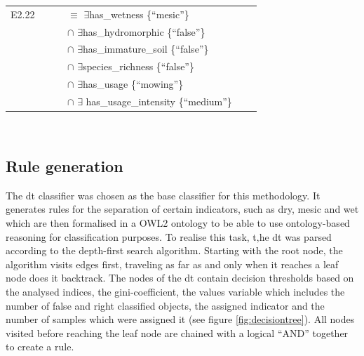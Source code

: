 \documentclass[authoryear,review,12pt,number]{elsarticle}
\begin{document}
\begin{tabular}[h]{p{0.8cm}l p{2cm}l}
    E2.22 &$\qquad$ {} $\equiv$ $\exists$has\_wetness \{``mesic''\} \\
      \ &$\qquad$ {} $\cap$ $\exists$has\_hydromorphic \{``false''\} \\
      \ &$\qquad$ {} $\cap$ $\exists$has\_immature\_soil \{``false''\} \\
     &$\qquad$ {} $\cap$ $\exists$species\_richness \{``false''\} \\
     &$\qquad$ {} $\cap$ $\exists$has\_usage \{``mowing''\} \\
     &$\qquad$ {} $\cap$ $\exists$ has\_usage\_intensity \{``medium''\} \\
\end{tabular}\label{eq:description_logic}\\


\subsection{Rule generation}
\label{subsec:rule_generation}

The \gls{dt} classifier was chosen as the base classifier for this methodology.
It generates rules for the separation of certain indicators, such as dry, mesic
and wet which are then formalised in a OWL2 ontology to be able to use
ontology-based reasoning for classification purposes. To realise this task, t‚he
\gls{dt} was parsed according to the depth-first search algorithm. %
Starting with the root node, the algorithm visits edges first, traveling as far as and
only when it reaches a leaf node does it backtrack.%
 The nodes of the \gls{dt} contain decision thresholds based on the analysed
 indices, the gini-coefficient, the values variable which includes the number
 of false and right classified objects,%
 the assigned indicator and the number of samples which were assigned it (see
 figure \ref{fig:decisiontree}). All nodes visited before reaching the leaf node
 are chained with a logical ``AND'' together to
 create a rule. 
\end{document}

